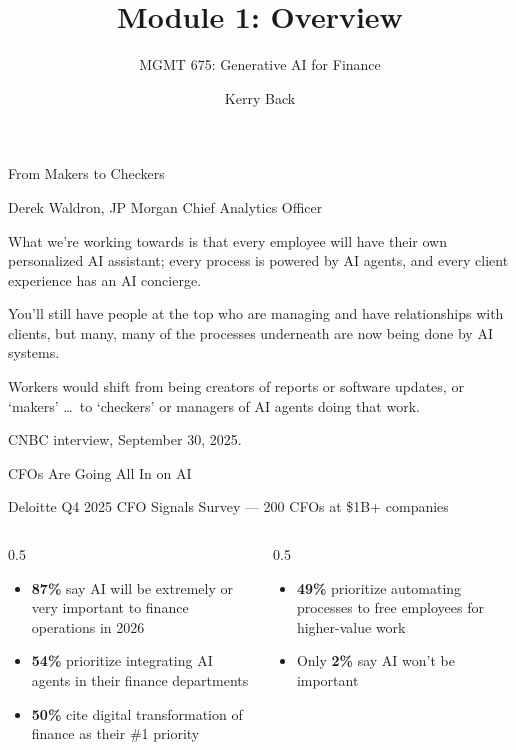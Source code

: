 \documentclass[aspectratio=169]{beamer}
\subtitle{MGMT 675: Generative AI for Finance}
\title{Module 1: Overview}
\author{Kerry Back}
\date{}
\begin{document}
\maketitle

\begin{frame}{From Makers to Checkers}
\vfill
\centerline{Derek Waldron, JP Morgan Chief Analytics Officer}

What we're working towards is that every employee will have their own personalized AI assistant; every process is powered by AI agents, and every client experience has an AI concierge.

You'll still have people at the top who are managing and have relationships with clients, but many, many of the processes underneath are now being done by AI systems.

Workers would shift from being creators of reports or software updates, or `makers' \ldots\ to `checkers' or managers of AI agents doing that work.

\vfill
\centerline{\scriptsize CNBC interview, September 30, 2025.}
\end{frame}

\begin{frame}{CFOs Are Going All In on AI}
\centerline{Deloitte Q4 2025 CFO Signals Survey --- 200 CFOs at \$1B+ companies}
\vspace{0.3cm}
\begin{columns}[T]
\begin{column}{0.5\textwidth}
\begin{itemize}
  \item \textbf{87\%} say AI will be extremely or very important to finance operations in 2026
  \item \textbf{54\%} prioritize integrating AI agents in their finance departments
  \item \textbf{50\%} cite digital transformation of finance as their \#1 priority
\end{itemize}
\end{column}
\begin{column}{0.5\textwidth}
\begin{itemize}
  \item \textbf{49\%} prioritize automating processes to free employees for higher-value work
  \item Only \textbf{2\%} say AI won't be important
\end{itemize}
\end{column}
\end{columns}
\end{frame}
\end{document}
